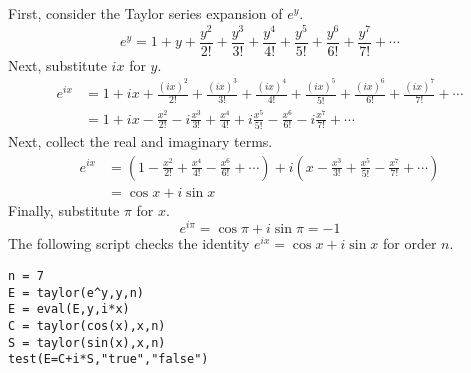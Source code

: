 \documentclass[11pt]{article}
\begin{document}
First, consider the Taylor series expansion of $e^y$.
\[
e^y=1+y+\frac{y^2}{2!}+\frac{y^3}{3!}+\frac{y^4}{4!}
+\frac{y^5}{5!}+\frac{y^6}{6!}+\frac{y^7}{7!}+\cdots
\]
Next, substitute $ix$ for $y$.
\begin{align*}
e^{ix}&=1+ix+\frac{(ix)^2}{2!}+\frac{(ix)^3}{3!}+\frac{(ix)^4}{4!}
+\frac{(ix)^5}{5!}+\frac{(ix)^6}{6!}+\frac{(ix)^7}{7!}+\cdots\\
&=1+ix-\frac{x^2}{2!}-i\frac{x^3}{3!}+\frac{x^4}{4!}
+i\frac{x^5}{5!}-\frac{x^6}{6!}-i\frac{x^7}{7!}+\cdots
\end{align*}
Next, collect the real and imaginary terms.
\begin{align*}
e^{ix}&=\left(1-\frac{x^2}{2!}+\frac{x^4}{4!}-\frac{x^6}{6!}+\cdots\right)
+i\left(x-\frac{x^3}{3!}+\frac{x^5}{5!}-\frac{x^7}{7!}+\cdots\right)\\
&=\cos x+i\sin x
\end{align*}
Finally, substitute $\pi$ for $x$.
\[
e^{i\pi}=\cos\pi+i\sin\pi=-1
\]
The following script checks the identity $e^{ix}=\cos x+i\sin x$ for order $n$.
\begin{Verbatim}[formatcom=\color{blue}]
n = 7
E = taylor(e^y,y,n)
E = eval(E,y,i*x)
C = taylor(cos(x),x,n)
S = taylor(sin(x),x,n)
test(E=C+i*S,"true","false")
\end{Verbatim}

\newpage



\newpage



\newpage


\end{document}
